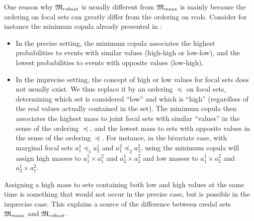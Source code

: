 \begin{remark}
    One reason why $\mathfrak{M}_{robust}$ is usually different from $\mathfrak{M}_{mass}$ is mainly because the ordering on focal sets can greatly differ from the ordering on reals. Consider for instance the minimum copula already presented in :
    \begin{itemize}
        \item In the precise setting, the minimum copula associates the highest probabilities to events with similar values (high-high or low-low), and the lowest probabilities to events with opposite values (low-high).
        \item In the imprecise setting, the concept of high or low values for focal sets does not usually exist. We thus replace it by an ordering $\preceq$ on focal sets, determining which set is considered ``low'' and which is ``high'' (regardless of the real values actually contained in the set). The minimum copula then associates the highest mass to joint focal sets with similar ``values'' in the sense of the ordering $\preceq$, and the lowest mass to sets with opposite values in the sense of the ordering $\preceq$. For instance, in the bivariate case, with marginal focal sets $a_1^1\preceq_1 a_2^1$ and $a^2_1\preceq_2 a^2_2$, using the minimum copula will assign high masses to $a^1_1\times a^2_1$ and $a^1_2\times a^2_2$ and low masses to $a^1_1\times a^2_2$ and $a^1_2\times a^2_1$.
    \end{itemize}
    Assigning a high mass to sets containing both low and high values at the same time is something that would not occur in the precise case, but is possible in the imprecise case. This explains a source of the difference between credal sets $\mathfrak{M}_{mass}$ and $\mathfrak{M}_{robust}$. 
\end{remark}

